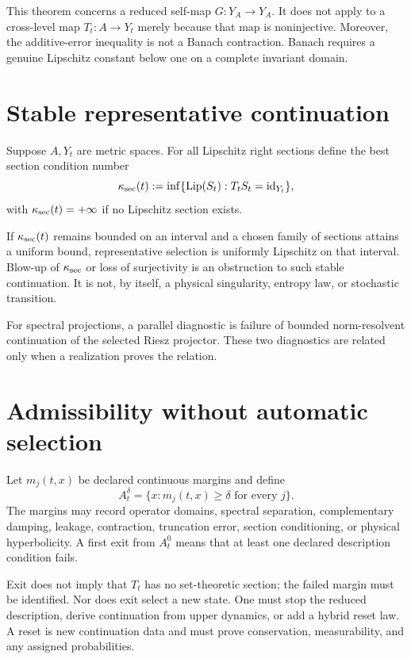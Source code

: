\documentclass[11pt]{article}
\begin{document}
This theorem concerns a reduced self-map $G:Y_A\to Y_A$. It does not apply to
a cross-level map $T_t:A\to Y_t$ merely because that map is noninjective.
Moreover, the additive-error inequality is not a Banach contraction. Banach
requires a genuine Lipschitz constant below one on a complete invariant
domain.

\section{Stable representative continuation}

Suppose $A,Y_t$ are metric spaces. For all Lipschitz right sections define the
best section condition number
\[
 \kappa_{\rm sec}(t)
 :=\inf\{\operatorname{Lip}(S_t):T_tS_t=\operatorname{id}_{Y_t}\},
\]
with $\kappa_{\rm sec}(t)=+\infty$ if no Lipschitz section exists.

\begin{proposition}
If $\kappa_{\rm sec}(t)$ remains bounded on an interval and a chosen family of
sections attains a uniform bound, representative selection is uniformly
Lipschitz on that interval. Blow-up of $\kappa_{\rm sec}$ or loss of
surjectivity is an obstruction to such stable continuation. It is not, by
itself, a physical singularity, entropy law, or stochastic transition.
\end{proposition}

For spectral projections, a parallel diagnostic is failure of bounded
norm-resolvent continuation of the selected Riesz projector. These two
diagnostics are related only when a realization proves the relation.

\section{Admissibility without automatic selection}

Let $m_j(t,x)$ be declared continuous margins and define
\[
 A_t^\delta=\{x:m_j(t,x)\ge\delta\text{ for every }j\}.
\]
The margins may record operator domains, spectral separation, complementary
damping, leakage, contraction, truncation error, section conditioning, or
physical hyperbolicity. A first exit from $A_t^0$ means that at least one
declared description condition fails.

Exit does not imply that $T_t$ has no set-theoretic section; the failed margin
must be identified. Nor does exit select a new state. One must stop the reduced
description, derive continuation from upper dynamics, or add a hybrid reset
law. A reset is new continuation data and must prove conservation,
measurability, and any assigned probabilities.
\end{document}

